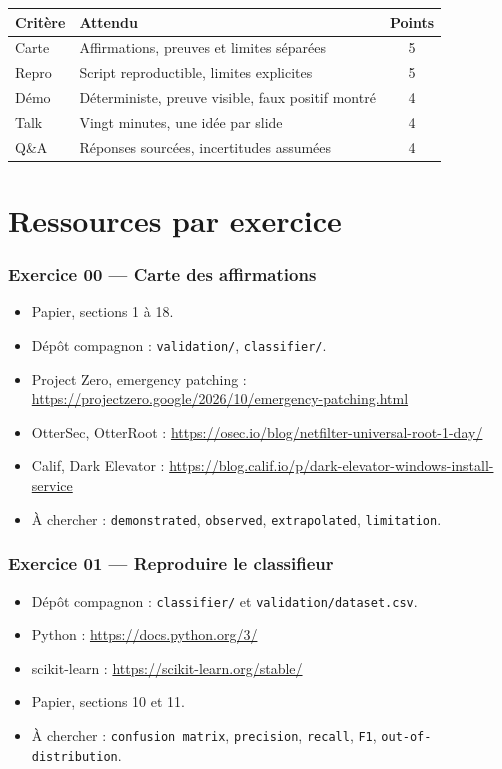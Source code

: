\documentclass{training}
\begin{document}
\begin{center}
\begin{tabularx}{\linewidth}{|l|X|c|}
\hline
\textbf{Critère} & \textbf{Attendu} & \textbf{Points} \\ \hline
Carte & Affirmations, preuves et limites séparées & 5 \\ \hline
Repro & Script reproductible, limites explicites & 5 \\ \hline
Démo & Déterministe, preuve visible, faux positif montré & 4 \\ \hline
Talk & Vingt minutes, une idée par slide & 4 \\ \hline
Q\&A & Réponses sourcées, incertitudes assumées & 4 \\ \hline
\end{tabularx}
\end{center}

\chapter{Ressources par exercice}

\subsection*{Exercice 00 --- Carte des affirmations}
\begin{itemize}
  \item Papier, sections 1 à 18.
  \item Dépôt compagnon : \texttt{validation/}, \texttt{classifier/}.
  \item Project Zero, emergency patching :
        \url{https://projectzero.google/2026/10/emergency-patching.html}
  \item OtterSec, OtterRoot :
        \url{https://osec.io/blog/netfilter-universal-root-1-day/}
  \item Calif, Dark Elevator :
        \url{https://blog.calif.io/p/dark-elevator-windows-install-service}
  \item À chercher : \texttt{demonstrated}, \texttt{observed},
        \texttt{extrapolated}, \texttt{limitation}.
\end{itemize}

\subsection*{Exercice 01 --- Reproduire le classifieur}
\begin{itemize}
  \item Dépôt compagnon : \texttt{classifier/} et
        \texttt{validation/dataset.csv}.
  \item Python : \url{https://docs.python.org/3/}
  \item scikit-learn : \url{https://scikit-learn.org/stable/}
  \item Papier, sections 10 et 11.
  \item À chercher : \texttt{confusion matrix}, \texttt{precision},
        \texttt{recall}, \texttt{F1}, \texttt{out-of-distribution}.
\end{itemize}
\end{document}
